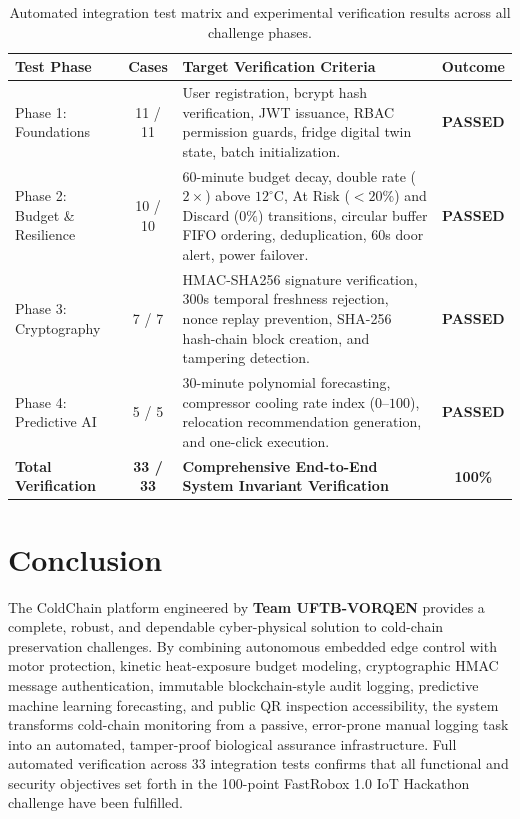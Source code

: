 \documentclass[11pt,a4paper]{article}
\begin{document}
\begin{table}[h!]
\centering
\small
\renewcommand{\arraystretch}{1.2}
\begin{tabularx}{\textwidth}{l c X c}
\toprule
\textbf{Test Phase} & \textbf{Cases} & \textbf{Target Verification Criteria} & \textbf{Outcome} \\
\midrule
Phase 1: Foundations & 11 / 11 & User registration, bcrypt hash verification, JWT issuance, RBAC permission guards, fridge digital twin state, batch initialization. & \textbf{PASSED} \\
\addlinespace
Phase 2: Budget \& Resilience & 10 / 10 & 60-minute budget decay, double rate ($2\times$) above $12^\circ\text{C}$, At Risk ($<20\%$) and Discard ($0\%$) transitions, circular buffer FIFO ordering, deduplication, 60s door alert, power failover. & \textbf{PASSED} \\
\addlinespace
Phase 3: Cryptography & 7 / 7 & HMAC-SHA256 signature verification, 300s temporal freshness rejection, nonce replay prevention, SHA-256 hash-chain block creation, and tampering detection. & \textbf{PASSED} \\
\addlinespace
Phase 4: Predictive AI & 5 / 5 & 30-minute polynomial forecasting, compressor cooling rate index ($0$--$100$), relocation recommendation generation, and one-click execution. & \textbf{PASSED} \\
\midrule
\textbf{Total Verification} & \textbf{33 / 33} & \textbf{Comprehensive End-to-End System Invariant Verification} & \textbf{100\%} \\
\bottomrule
\end{tabularx}
\caption{Automated integration test matrix and experimental verification results across all challenge phases.}
\label{tab:test_matrix}
\end{table}

\section{Conclusion}

The ColdChain platform engineered by \textbf{Team UFTB-VORQEN} provides a complete, robust, and dependable cyber-physical solution to cold-chain preservation challenges. By combining autonomous embedded edge control with motor protection, kinetic heat-exposure budget modeling, cryptographic HMAC message authentication, immutable blockchain-style audit logging, predictive machine learning forecasting, and public QR inspection accessibility, the system transforms cold-chain monitoring from a passive, error-prone manual logging task into an automated, tamper-proof biological assurance infrastructure. Full automated verification across 33 integration tests confirms that all functional and security objectives set forth in the 100-point FastRobox 1.0 IoT Hackathon challenge have been fulfilled.
\end{document}
